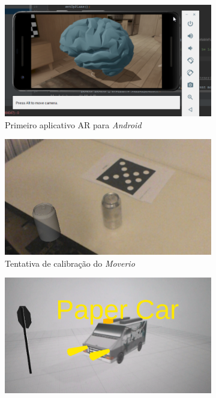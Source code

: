 \begin{figure}[ht]
\centering
    \begin{subfigure}{0.45\textwidth}
        \centering
        \includegraphics[width=.95\textwidth]{figuras/sceneform.png}
        \caption{Primeiro aplicativo AR para \textit{Android}}
        \label{fig:sceneform}
    \end{subfigure}
    \begin{subfigure}{0.45\textwidth}
        \includegraphics[width=.95\linewidth]{figuras/Latinha-errada.png}
        \caption{Tentativa de calibração do \textit{Moverio}}
        \label{fig:latinha}
    \end{subfigure}
    \begin{subfigure}{0.45\textwidth}
        \centering
        \includegraphics[width=.95\textwidth]{figuras/PaperCarAR.png}

\end{subfigure}
\end{figure}
